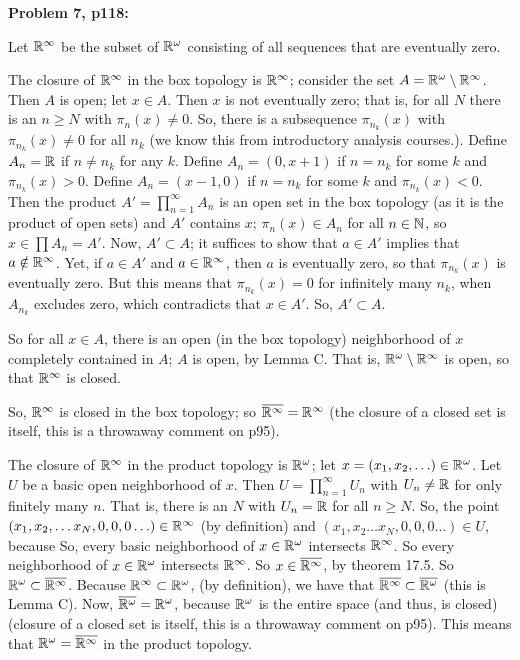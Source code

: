 \documentclass[a4paper,12pt]{article}
\begin{document}
\shunt

{\bf Problem 7, p118:}

Let $\mathbb{R}^\infty$ be the subset of $\mathbb{R}^\omega$ consisting of all sequences that are eventually zero.

The closure of $\mathbb{R}^\infty$ in the box topology is $\mathbb{R}^\infty$; consider the set $A= \mathbb{R}^\omega \setminus \mathbb{R}^\infty$. Then $A$ is open; let $x \in A$. Then $x$ is not eventually zero; that is, for all $N$ there is an $n \geq N$ with $\pi_n(x) \neq 0$. So, there is a subsequence $\pi_{n_k}(x)$ with $\pi_{n_k}(x) \neq 0$ for all $n_k$ (we know this from introductory analysis courses.). Define $A_n = \mathbb{R}$ if $n \neq n_k$ for any $k$. Define $A_n= (0,x+1)$ if $n = n_k$ for some $k$ and $\pi_{n_k}(x) >0$. Define $A_n = (x-1,0)$ if $n = n_k$ for some $k$ and $\pi_{n_k}(x) < 0$. Then the product $A' =\prod\limits_{n=1}^\infty A_n$ is an open set in the box topology (as it is the product of open sets) and $A'$ contains $x$; $\pi_n(x) \in A_n$ for all $n \in \mathbb{N}$, so $x \in \prod A_n = A'$. Now, $A' \subset A$; it suffices to show that $a \in A'$ implies that $a \notin \mathbb{R}^\infty$. Yet, if $a \in A'$ and $a \in \mathbb{R}^\infty$, then $a$ is eventually zero, so that $\pi_{n_k}(x)$ is eventually zero. But this means that $\pi_{n_k}(x) = 0$ for infinitely many $n_k$, when $A_{n_k}$ excludes zero, which contradicts that $x \in A'$. So, $A' \subset A$.

So for all $x \in A$, there is an open (in the box topology) neighborhood of $x$ completely contained in $A$; $A$ is open, by Lemma C. That is, $\mathbb{R}^\omega \setminus \mathbb{R}^\infty$ is open, so that $\mathbb{R}^\infty$ is closed.

So, $\mathbb{R}^\infty$ is closed in the box topology; so $\overline{\mathbb{R}^\infty} = \mathbb{R}^\infty$ (the closure of a closed set is itself, this is a throwaway comment on p95).

The closure of $\mathbb{R}^\infty$ in the product topology is $\mathbb{R}^\omega$; let $x = (x_1,x_2, \ldots) \in \mathbb{R}^\omega$. Let $U$ be a basic open neighborhood of $x$. Then $U = \prod_{n=1}^\infty U_n$ with $U_n \neq \mathbb{R}$ for only finitely many $n$. That is, there is an $N$ with $U_n = \mathbb{R}$ for all $n \geq N$. So, the point $(x_1,x_2, \ldots x_N, 0,0,0 \ldots) \in \mathbb{R}^\infty$ (by definition) and $(x_1,x_2 \ldots x_N,0,0,0\ldots) \in U$, because %
So, every basic neighborhood of $x \in \mathbb{R}^\omega$ intersects $\mathbb{R}^\infty$. So every neighborhood of $x \in \mathbb{R}^\omega$ intersects $\mathbb{R}^\infty$. So $x \in \overline{\mathbb{R}^\infty}$, by theorem 17.5. So $\mathbb{R}^\omega \subset \overline{\mathbb{R}^\infty}$. Because $\mathbb{R}^\infty \subset \mathbb{R}^\omega$, (by definition), we have that $\overline{\mathbb{R}^\infty} \subset \overline{\mathbb{R}^\omega}$ (this is Lemma C). Now, $\overline{\mathbb{R}^\omega} = \mathbb{R}^\omega$, because $\mathbb{R}^\omega$ is the entire space (and thus, is closed) (closure of a closed set is itself, this is a throwaway comment on p95). This means that $\mathbb{R}^\omega = \overline{\mathbb{R}^\infty}$ in the product topology.
\end{document}
